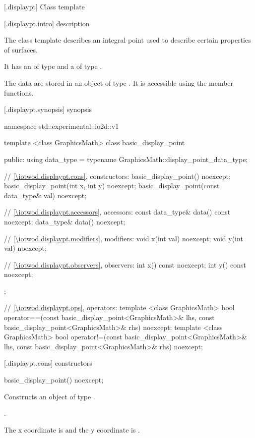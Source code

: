 [\iotwod.displaypt] {Class template }

 [\iotwod.displaypt.intro] { description}

%
\pnum
The class template  describes an integral point used to describe certain properties of surfaces.

\pnum
It has an  of type  and a  of type .

\pnum
The data are stored in an object of type . It is accessible using the  member functions.

 [\iotwod.displaypt.synopsis] { synopsis}

\begin{codeblock}
namespace std::experimental::io2d::v1 {
  template <class GraphicsMath>
  class basic_display_point {
  public:
    using data_type = typename GraphicsMath::display_point_data_type;
    
    // \ref{\iotwod.displaypt.cons}, constructors:
    basic_display_point() noexcept;
    basic_display_point(int x, int y) noexcept;
    basic_display_point(const data_type& val) noexcept;

    // \ref{\iotwod.displaypt.accessors}, accessors:
    const data_type& data() const noexcept;
    data_type& data() noexcept;

    // \ref{\iotwod.displaypt.modifiers}, modifiers:
    void x(int val) noexcept;
    void y(int val) noexcept;

    // \ref{\iotwod.displaypt.observers}, observers:
    int x() const noexcept;
    int y() const noexcept;
  };

  // \ref{\iotwod.displaypt.ops}, operators:
  template <class GraphicsMath>
  bool operator==(const basic_display_point<GraphicsMath>& lhs,
    const basic_display_point<GraphicsMath>& rhs) noexcept;
  template <class GraphicsMath>
  bool operator!=(const basic_display_point<GraphicsMath>& lhs,
    const basic_display_point<GraphicsMath>& rhs) noexcept;
}
\end{codeblock}

 [\iotwod.displaypt.cons] { constructors}

%
\begin{itemdecl}
basic_display_point() noexcept;
\end{itemdecl}
\begin{itemdescr}
\pnum
\effects
Constructs an object of type .

\pnum
\postconditions
{}.

\pnum
\remarks
The x coordinate is  and the y coordinate is .
\end{itemdescr}

